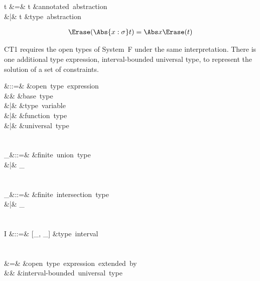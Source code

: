 \documentclass{amsart}
\begin{document}
\begin{syntax}
t &\+=& t &\mbox{annotated abstraction}\\
&|& \Tabs\alpha t &\mbox{type abstraction}
\end{syntax}%
%
\begin{align*}
\Erase(\Abs{x:\sigma}t) & = \Abs x\Erase(t)\\
\end{align*}


CT1 requires the open types of System~F under the same
interpretation. There is one additional type expression,
interval-bounded universal type, to represent the solution of a
set of constraints.

\begin{syntax}
\sigma &::=& &\mbox{open type expression}\\
&& \iota &\mbox{base type}\\
&|& \alpha &\mbox{type variable}\\
&|& \sigma\R\sigma &\mbox{function type}\\
&|& \All\alpha\sigma &\mbox{universal type}\\
\\\\
\sigma_\cup &::=& \sigma &\mbox{finite union type}\\
&|& \sigma \cup \sigma_\cup\\
\\\\
\sigma_\cap &::=& \sigma &\mbox{finite intersection type}\\
&|& \sigma \cap \sigma_\cap\\
\\\\
I &::=& [\sigma_\cup, \sigma_\cap] &\mbox{type interval}\\
\\\\
\sigma &\+=& \sigma &\mbox{open type expression
extended by}\\
&& &\mbox{interval-bounded universal type}
\end{syntax}%

\end{document}
